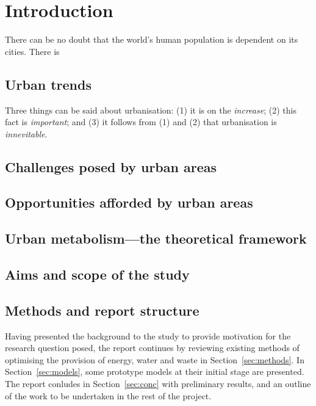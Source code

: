 \section{Introduction}

There can be no doubt that the world's human population is dependent on its cities. There is 

\subsection{Urban trends}
Three things can be said about urbanisation: (1) it is on the \emph{increase}; (2) this fact is \emph{important}; and (3) it follows from (1) and (2) that urbanisation is \emph{innevitable}.

\subsection{Challenges posed by urban areas}

\subsection{Opportunities afforded by urban areas}

\subsection{Urban metabolism---the theoretical framework}

\subsection{Aims and scope of the study}


\subsection{Methods and report structure}
Having presented the background to the study to provide motivation for the research question posed, the report continues by reviewing existing methods of optimising the provision of energy, water and waste in Section~\ref{sec:methods}. In Section~\ref{sec:models}, some prototype models at their initial stage are presented. The report conludes in Section~\ref{sec:conc} with preliminary results, and an outline of the work to be undertaken in the rest of the project.
